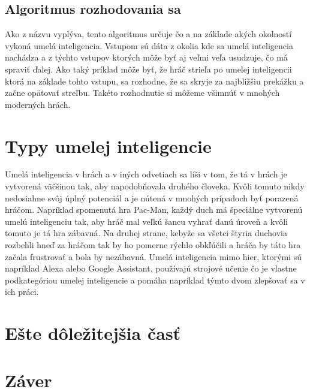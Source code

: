 \documentclass[10pt,twoside,slovak,a4paper]{article}
\begin{document}
\subsection{Algoritmus rozhodovania sa} \label{kapitola3.2}
Ako z názvu vyplýva, tento algoritmus určuje čo a na základe akých okolností vykoná umelá inteligencia. Vstupom sú dáta z okolia kde sa umelá inteligencia nachádza a z týchto vstupov ktorých môže byť aj veľmi veľa usudzuje, čo má spraviť ďalej. Ako taký príklad môže byť, že hráč strieľa po umelej inteligencii ktorá na základe tohto vstupu, sa rozhodne, že sa skryje za najbližšiu prekážku a začne opätovať streľbu. Takéto rozhodnutie si môžeme všimnúť v mnohých moderných hrách.


\section{Typy umelej inteligencie} \label{kapitola4}
Umelá inteligencia v hrách a v iných odvetiach sa líši v tom, že tá v hrách je vytvorená väčšinou tak, aby napodobňovala druhého človeka. Kvôli tomuto nikdy nedosiahne svôj úplný potenciál a je nútená v mnohých prípadoch byť porazená hráčom. Napríklad spomenutá hra Pac-Man, každý duch má špeciálne vytvorenú umelú inteligenciu tak, aby hráč mal veľkú šancu vyhrať danú úroveň a kvôli tomuto je tá hra zábavná. Na druhej strane, kebyže sa všetci štyria duchovia rozbehli hneď za hráčom tak by ho pomerne rýchlo obkľúčili a hráča by táto hra začala frustrovať a bola by nezábavná. Umelá inteligencia mimo hier, ktorými sú napríklad Alexa alebo Google Assistant, používajú strojové učenie čo je vlastne podkategóriou umelej inteligencie a pomáha napríklad týmto dvom zlepšovať sa v ich práci.




\section{Ešte dôležitejšia časť} \label{dolezitejsia}




\section{Záver} \label{zaver} %






\end{document}
